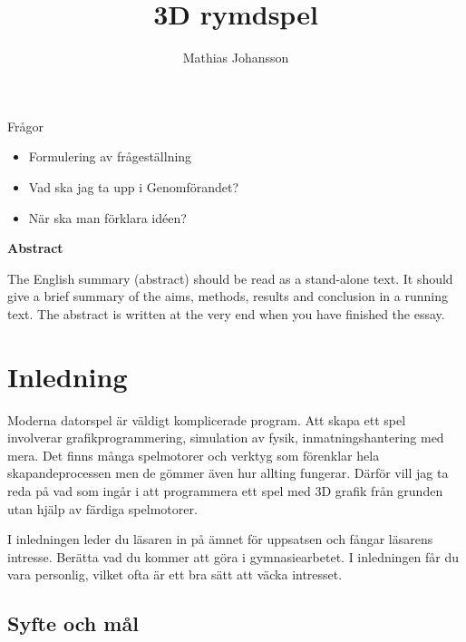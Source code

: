 \documentclass[12pt, a4paper]{article}
\title{3D rymdspel}
\author{Mathias Johansson}
\begin{document}
	\maketitle
	
	{\Large Frågor}
	\begin{itemize}
		\item Formulering av frågeställning
		\item Vad ska jag ta upp i Genomförandet?
		\item När ska man förklara idéen?
	\end{itemize}
	
	\newpage
	
	\begin{center}
		\Large\textbf{Abstract}
	\end{center}
	
	\begin{small}
		The English summary (abstract) should be read as a stand-alone text. It should
give a brief summary of the aims, methods, results and conclusion in a running
text. The abstract is written at the very end when you have finished the essay.
	\end{small}
	
	\newpage
	
	\tableofcontents
	
	\newpage
	
	\section{Inledning}

	Moderna datorspel är väldigt komplicerade program. Att skapa ett spel involverar grafikprogrammering, simulation av fysik, inmatningshantering med mera. Det finns många spelmotorer och verktyg som förenklar hela skapandeprocessen men de gömmer även hur allting fungerar. Därför vill jag ta reda på vad som ingår i att programmera ett spel med 3D grafik från grunden utan hjälp av färdiga spelmotorer. 
	
	\begin{small}
		I inledningen leder du läsaren in på ämnet för uppsatsen och fångar läsarens
intresse. Berätta vad du kommer att göra i gymnasiearbetet. I inledningen får
du vara personlig, vilket ofta är ett bra sätt att väcka intresset.
	\end{small}
	
	\subsection{Syfte och mål}
	
\end{document}

